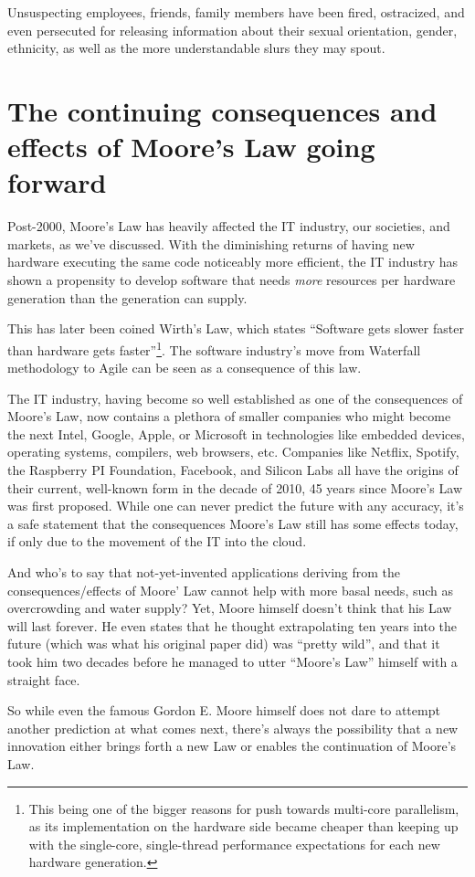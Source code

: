 \documentclass[a4paper,12pt]{article}
\begin{document}
Unsuspecting employees, friends, family members have been fired, ostracized, and even persecuted for releasing information about their sexual orientation, gender, ethnicity, as well as the more understandable slurs they may spout.

\section*{The continuing consequences and effects of Moore's Law going forward}

Post-2000, Moore's Law has heavily affected the IT industry, our societies, and markets, as we've discussed.
With the diminishing returns of having new hardware executing the same code noticeably more efficient, the IT industry has shown a propensity to develop software that needs \emph{more} resources per hardware generation than the generation can supply.

This has later been coined Wirth's Law\cite{TheGreatMoore'sLawCompensator}, which states ``Software gets slower faster than hardware gets faster''\footnote{This being one of the bigger reasons for push towards multi-core parallelism, as its implementation on the hardware side became cheaper than keeping up with the single-core, single-thread performance expectations for each new hardware generation.}.
The software industry's move from Waterfall methodology to Agile can be seen as a consequence of this law.

The IT industry, having become so well established as one of the consequences of Moore's Law, now contains a plethora of smaller companies who might become the next Intel, Google, Apple, or Microsoft in technologies like embedded devices, operating systems, compilers, web browsers, etc.
Companies like Netflix, Spotify, the Raspberry PI Foundation, Facebook, and Silicon Labs all have the origins of their current, well-known form in the decade of 2010, 45 years since Moore's Law was first proposed.
While one can never predict the future with any accuracy, it's a safe statement that the consequences Moore's Law still has some effects today, if only due to the movement of the IT into the cloud\cite{Moore'sLawCloudPricing}.

And who's to say that not-yet-invented applications deriving from the consequences/effects of Moore' Law cannot help with more basal needs\cite{Moore'sLawTurns50}, such as overcrowding and water supply?
Yet, Moore himself\cite{MooreSpeculates} doesn't think that his Law will last forever.
He even states that he thought extrapolating ten years into the future (which was what his original paper did) was ``pretty wild'', and that it took him two decades before he managed to utter ``Moore's Law'' himself with a straight face.

So while even the famous Gordon E. Moore himself does not dare to attempt another prediction at what comes next, there's always the possibility that a new innovation either brings forth a new Law or enables the continuation of Moore's Law\cite{FutureForTransistor}.



\end{document}
